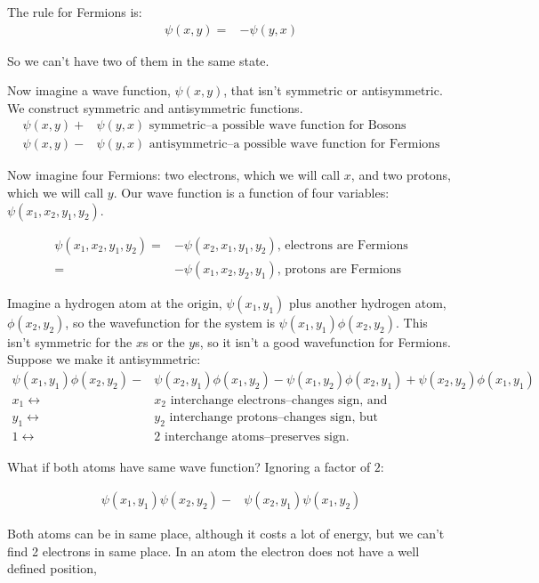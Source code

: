\documentclass[]{article}
\begin{document}
The rule for Fermions is:
\begin{align*}
		\psi(x,y) =&-\psi(y,x)
\end{align*}

So we can't have two of them in the same state.

Now imagine a wave function, $\psi(x,y)$, that isn't symmetric or antisymmetric. We construct symmetric and antisymmetric functions.
\begin{align*}
	\psi(x,y)+& \psi(y,x) \text{ symmetric--a possible wave function for Bosons}\\
	\psi(x,y)-& \psi(y,x) \text{ antisymmetric--a possible wave function for Fermions}
\end{align*}

Now imagine four Fermions: two electrons, which we will call $x$, and two protons, which we will call $y$. Our wave function is a function of four variables: $\psi(x_1,x_2,y_1,y_2)$.

\begin{align*}
	\psi(x_1,x_2,y_1,y_2) = &-\psi(x_2,x_1,y_1,y_2) \text{, electrons are Fermions}\\
	=& - \psi(x_1,x_2,y_2,y_1) \text{, protons are Fermions}
\end{align*} 

Imagine a hydrogen atom at the origin, $\psi(x_1,y_1)$ plus another hydrogen atom, $\phi(x_2,y_2)$, so the wavefunction for the system is $\psi(x_1,y_1)\phi(x_2,y_2)$. This isn't symmetric for the $x$s or the $y$s, so it isn't a good wavefunction for Fermions. Suppose we make it antisymmetric:
\begin{align*}
	\psi(x_1,y_1) \phi(x_2,y_2) -& \psi(x_2,y_1) \phi(x_1,y_2) 
	-\psi(x_1,y_2) \phi(x_2,y_1) + \psi(x_2,y_2) \phi(x_1,y_1)\\
	x_1 \leftrightarrow& x_2 \text{ interchange electrons--changes sign, and}\\
	y_1 \leftrightarrow& y_2 \text{ interchange protons--changes sign, but}\\
	1 \leftrightarrow& 2 \text { interchange atoms--preserves sign.}
\end{align*}

What if both atoms have same wave function? Ignoring a factor of $2$:

\begin{align*}
	\psi(x_1,y_1) \psi(x_2,y_2) -& \psi(x_2,y_1) \psi(x_1,y_2) 
\end{align*}

Both atoms can be in same place, although it costs a lot of energy, but we can't find 2 electrons in same place. In an atom the electron does not have a well defined position, 
\end{document}
